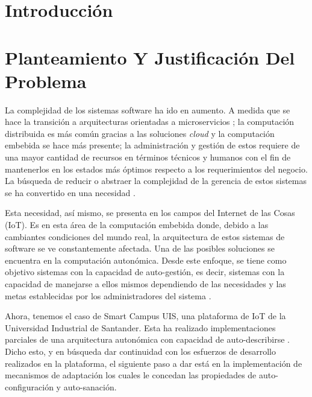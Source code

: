 \documentclass[12pt]{article}
\begin{document}
    
    
    \section{Introducción}


    
    

    \section{Planteamiento Y Justificación Del Problema}
    
    La complejidad de los sistemas software ha ido en aumento. A medida que se hace la transición a arquitecturas orientadas a microservicios \cite{forrester_research_2019}; la computación distribuida es más común gracias a las soluciones \textit{cloud} \cite{the_cloud_in_2021} y la computación embebida se hace más presente;  la administración y gestión de estos requiere de una mayor cantidad de recursos en términos técnicos y humanos con el fin de mantenerlos en los estados más óptimos respecto a los requerimientos del negocio. La búsqueda de reducir o abstraer la complejidad de la gerencia de estos sistemas se ha convertido en una necesidad \cite{lalanda_diaconescu_mccann_2014}.
    
    Esta necesidad, así mismo, se presenta en los campos del Internet de las Cosas (IoT). Es en esta área de la computación embebida donde, debido a las cambiantes condiciones del mundo real, la arquitectura de estos sistemas de software se ve constantemente afectada. Una de las posibles soluciones se encuentra en la computación autonómica. Desde este enfoque, se tiene como objetivo sistemas con la capacidad de auto-gestión, es decir, sistemas con la capacidad de manejarse a ellos mismos dependiendo de las necesidades y las metas establecidas por los administradores del sistema \cite{evaluation_2004}.
    
    Ahora, tenemos el caso de Smart Campus UIS, una plataforma de IoT de la Universidad Industrial de Santander. Esta ha realizado implementaciones parciales de una arquitectura autonómica con capacidad de auto-describirse \cite{henry_2020}. Dicho esto, y en búsqueda dar continuidad con los esfuerzos de desarrollo realizados en la plataforma, el siguiente paso a dar está en la implementación de mecanismos de adaptación los cuales le concedan las propiedades de auto-configuración y auto-sanación.
\end{document}
